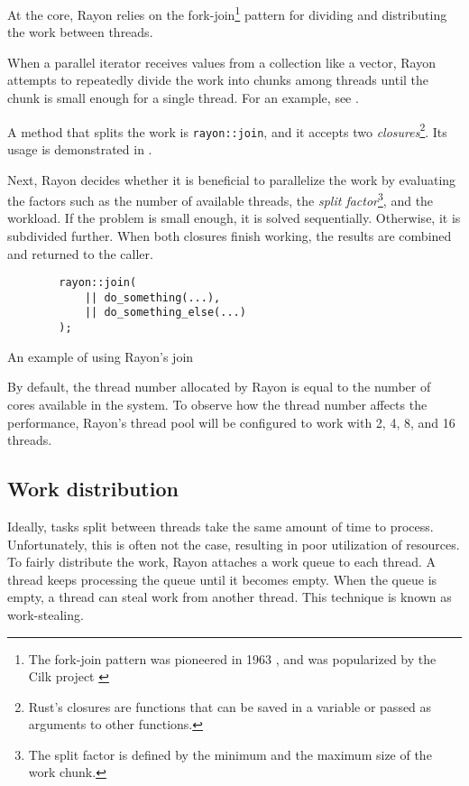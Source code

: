 At the core, Rayon relies on the fork-join\footnote{The fork-join pattern was pioneered in 1963 \cite{history-of-fork-join}, and was popularized by the Cilk project \cite{cilk}} pattern for dividing and distributing the work between threads.

When a parallel iterator receives values from a collection like a vector, Rayon attempts to repeatedly divide the work into chunks among threads until the chunk is small enough for a single thread. For an example, see .

A method that splits the work is \texttt{rayon::join}, and it accepts two \emph{closures}\footnote{Rust’s closures are functions that can be saved in a variable or passed as arguments to other functions.}. Its usage is demonstrated in .

Next, Rayon decides whether it is beneficial to parallelize the work by evaluating the factors such as the number of available threads, the \emph{split factor}\footnote{The split factor is defined by the minimum and the maximum size of the work chunk.}, and the workload. If the problem is small enough, it is solved sequentially. Otherwise, it is subdivided further. When both closures finish working, the results are combined and returned to the caller.

\begin{listing}[!htbp]

    \centering
    \begin{verbatim}
        rayon::join(
            || do_something(...),
            || do_something_else(...)
        );
    \end{verbatim}

    \caption{An example of using Rayon's join}
    \label{lst:rayon-join}
\end{listing}

By default, the thread number allocated by Rayon is equal to the number of cores available in the system. To observe how the thread number affects the performance, Rayon's thread pool will be configured to work with 2, 4, 8, and 16 threads.

\subsection{Work distribution}
Ideally, tasks split between threads take the same amount of time to process. Unfortunately, this is often not the case, resulting in poor utilization of resources. To fairly distribute the work, Rayon attaches a work queue to each thread. A thread keeps processing the queue until it becomes empty. When the queue is empty, a thread can steal work from another thread. This technique is known as work-stealing.

